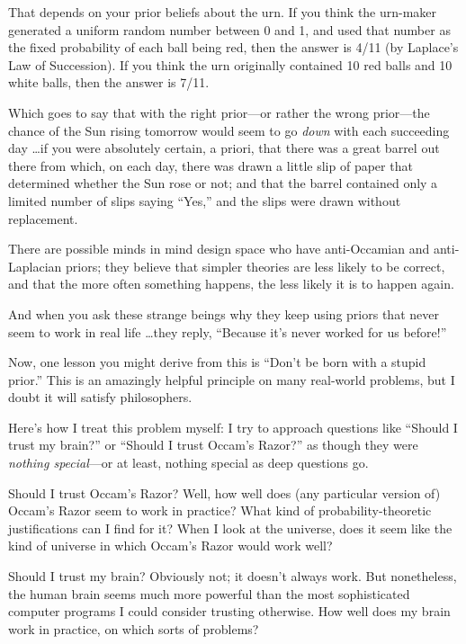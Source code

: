 {
 That depends on your prior beliefs about the urn. If you think the
urn-maker generated a uniform random number between 0 and 1, and used
that number as the fixed probability of each ball being red, then the
answer is 4/11 (by Laplace's Law of Succession). If you
think the urn originally contained 10 red balls and 10 white balls,
then the answer is 7/11.}

{
 Which goes to say that with the right prior---or rather the wrong
prior---the chance of the Sun rising tomorrow would seem to go
\textit{down} with each succeeding day \ldots if you were absolutely
certain, a priori, that there was a great barrel out there from which,
on each day, there was drawn a little slip of paper that determined
whether the Sun rose or not; and that the barrel contained only a
limited number of slips saying
``Yes,'' and the slips were drawn
without replacement.}

{
 There are possible minds in mind design space who have
anti-Occamian and anti-Laplacian priors; they believe that simpler
theories are less likely to be correct, and that the more often
something happens, the less likely it is to happen again.}

{
 And when you ask these strange beings why they keep using priors
that never seem to work in real life \ldots they reply,
``Because it's never worked for us
before!''}

{
 Now, one lesson you might derive from this is
``Don't be born with a stupid
prior.'' This is an amazingly helpful principle on
many real-world problems, but I doubt it will satisfy philosophers.}

{
 Here's how I treat this problem myself: I try to
approach questions like ``Should I trust my
brain?'' or ``Should I trust
Occam's Razor?'' as though they were
\textit{nothing special}{}---or at least, nothing special as deep
questions go.}

{
 Should I trust Occam's Razor? Well, how well does
(any particular version of) Occam's Razor seem to work
in practice? What kind of probability-theoretic justifications can I
find for it? When I look at the universe, does it seem like the kind of
universe in which Occam's Razor would work well?}

{
 Should I trust my brain? Obviously not; it doesn't
always work. But nonetheless, the human brain seems much more powerful
than the most sophisticated computer programs I could consider trusting
otherwise. How well does my brain work in practice, on which sorts of
problems?}

